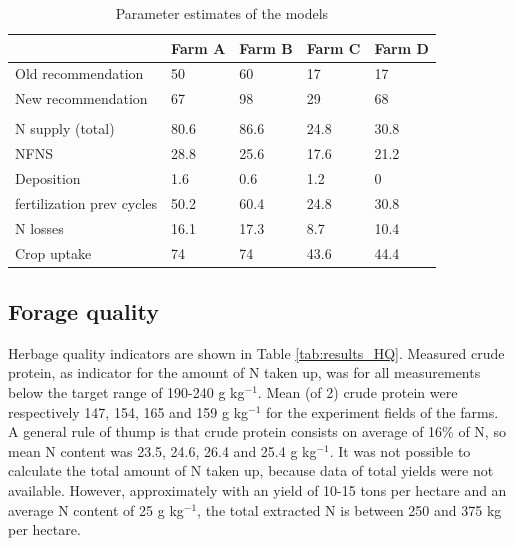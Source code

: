 \documentclass[10pt,twoside,dutch,english]{report}
\begin{document}
\begin{table}[h] %
	\caption{Parameter estimates of the models}
	\footnotesize 
	\renewcommand{\arraystretch}{1.2}
	
	
	\begin{tabu} to %
	\toprule \rowfont{\bfseries}
     &Farm A& Farm B & Farm C &Farm D \\     \midrule
Old recommendation     & 50                        & 60                       & 17                      & 17                       \\
New recommendation   & 67                        & 98                     & 29                      & 68                       \\ \\
N supply (total)   & 80.6                    & 86.6                  & 24.8                 & 30.8                   \\
\quad NFNS    & 28.8                     & 25.6                     & 17.6                   & 21.2                  \\
\quad Deposition     & 1.6                      & 0.6                       & 1.2                     & 0                    \\
\quad fertilization prev cycles & 50.2     & 60.4                    & 24.8                     & 30.8                   \\
      
N losses     & 16.1               & 17.3                   & 8.7                      & 10.4                      \\
Crop uptake      & 74                      & 74                     & 43.6                   & 44.4                   \\ \bottomrule
    
	\end{tabu}
		\label{tab:results_dynN}
\end{table}

\subsection{Forage quality}
Herbage quality indicators are shown in Table \ref{tab:results_HQ}. Measured crude protein, as indicator for the amount of N taken up, was for all measurements below the target range of 190-240 g kg$^{-1}$. Mean (of 2) crude protein were respectively 147, 154, 165 and 159 g kg$^{-1}$ for the experiment fields of the farms. A general rule of thump is that crude protein consists on average of 16\% of N, so mean N content was 23.5, 24.6, 26.4 and 25.4 g kg$^{-1}$. It was not possible to calculate the total amount of N taken up, because data of  total yields were not available. However, approximately with an yield of 10-15 tons per hectare and an average N content of 25 g kg$^{-1}$, the total extracted N is between 250 and 375 kg per hectare.  
\end{document}

